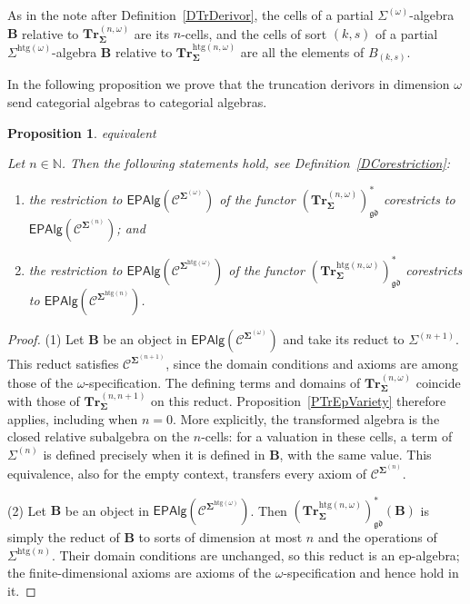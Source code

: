 \documentclass[a4paper, reqno]{amsbook}
\makeatletter
\newcommand{\sig}[1]{\mathbf{#1}}             %
\newcommand{\spec}[1]{\boldsymbol{\mathcal{#1}}} %
\newcommand{\gd}{\mathfrak{gd}}              %
\newcommand{\htg}{\mathrm{htg}}                %
\newcommand{\bTr}{\mathbf{Tr}}
\theoremstyle{plain}
\newtheorem{proposition}[theorem]{Proposition}
\theoremstyle{definition}
\newcommand*{\CA@leanpending}{}
\newcommand*{\CA@leanrelation}{}
\newcommand*{\lean}[2]{%
  \ifcsname\string\color@lean@#1\endcsname\else
    \PackageError{main}{Unknown relation `#1' in \string\lean}{Use equivalent, weaker or stronger.}%
  \fi
  \gdef\CA@leanrelation{#1}%
  \gdef\CA@leanpending{#2}}
\makeatother
\begin{document}
As in the note after Definition~\ref{DTrDerivor}, the cells of a partial $\Sigma^{(\omega)}$-algebra $\mathbf{B}$ relative to $\bTr^{(n,\omega)}_{\sig{\Sigma}}$ are its $n$-cells, and the cells of sort $(k,s)$ of a partial $\Sigma^{\htg(\omega)}$-algebra $\mathbf{B}$ relative to $\bTr^{\htg(n,\omega)}_{\sig{\Sigma}}$ are all the elements of $B_{(k,s)}$.

In the following proposition we prove that the truncation derivors in dimension $\omega$ send categorial algebras to categorial algebras.

\begin{proposition}\label{PTrEpVarietyOmega}\lean{equivalent}{Dimensions.homogeneousOmegaTruncation_isModel,Dimensions.heterogeneousOmegaTruncation_isModel}
Let $n\in\mathbb{N}$.
Then the following statements hold, see Definition~\ref{DCorestriction}:
\begin{enumerate}
\item the restriction to $\mathsf{EPAlg}(\spec{C}^{\sig{\Sigma}^{(\omega)}})$ of the functor $(\bTr^{(n,\omega)}_{\sig{\Sigma}})^{\ast}_{\gd}$ corestricts to $\mathsf{EPAlg}(\spec{C}^{\sig{\Sigma}^{(n)}})$; and
\item the restriction to $\mathsf{EPAlg}(\spec{C}^{\sig{\Sigma}^{\htg(\omega)}})$ of the functor $(\bTr^{\htg(n,\omega)}_{\sig{\Sigma}})^{\ast}_{\gd}$ corestricts to $\mathsf{EPAlg}(\spec{C}^{\sig{\Sigma}^{\htg(n)}})$.
\end{enumerate}
\end{proposition}
\begin{proof}
(1) Let $\mathbf{B}$ be an object in $\mathsf{EPAlg}(\spec{C}^{\sig{\Sigma}^{(\omega)}})$ and take its reduct to $\Sigma^{(n+1)}$.
This reduct satisfies $\spec{C}^{\sig{\Sigma}^{(n+1)}}$, since the domain conditions and axioms are among those of the $\omega$-specification.
The defining terms and domains of $\bTr^{(n,\omega)}_{\sig{\Sigma}}$ coincide with those of $\bTr^{(n,n+1)}_{\sig{\Sigma}}$ on this reduct.
Proposition~\ref{PTrEpVariety} therefore applies, including when $n=0$.
More explicitly, the transformed algebra is the closed relative subalgebra on the $n$-cells: for a valuation in these cells, a term of $\Sigma^{(n)}$ is defined precisely when it is defined in $\mathbf{B}$, with the same value.
This equivalence, also for the empty context, transfers every axiom of $\spec{C}^{\sig{\Sigma}^{(n)}}$.

(2) Let $\mathbf{B}$ be an object in $\mathsf{EPAlg}(\spec{C}^{\sig{\Sigma}^{\htg(\omega)}})$.
Then $(\bTr^{\htg(n,\omega)}_{\sig{\Sigma}})^{\ast}_{\gd}(\mathbf{B})$ is simply the reduct of $\mathbf{B}$ to sorts of dimension at most $n$ and the operations of $\Sigma^{\htg(n)}$.
Their domain conditions are unchanged, so this reduct is an ep-algebra; the finite-dimensional axioms are axioms of the $\omega$-specification and hence hold in it.
\end{proof}
\end{document}
